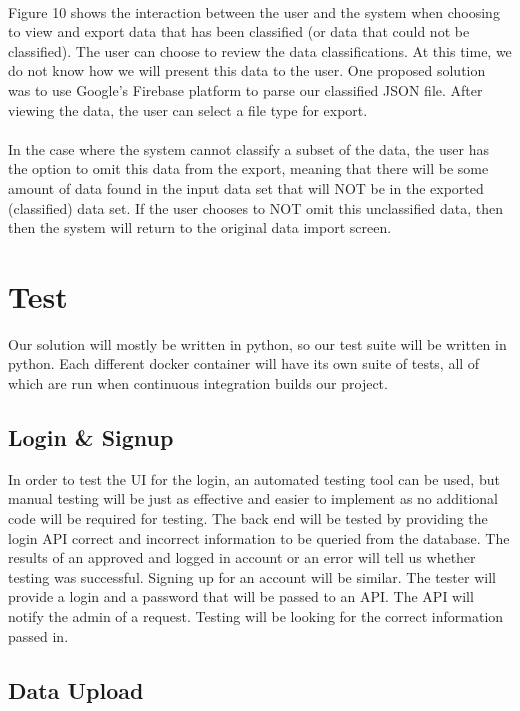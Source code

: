 \documentclass[12pt,oneside,letterpaper]{article}
\begin{document}
\paragraph{}Figure 10 shows the interaction between the user and the system when choosing to view and export data that has been classified (or data that could not be classified). The user can choose to review the data classifications. At this time, we do not know how we will present this data to the user. One proposed solution was to use Google's Firebase platform to parse our classified JSON file. After viewing the data, the user can select a file type for export.

\paragraph{}In the case where the system cannot classify a subset of the data, the user has the option to omit this data from the export, meaning that there will be some amount of data found in the input data set that will NOT be in the exported (classified) data set. If the user chooses to NOT omit this unclassified data, then then the system will return to the original data import screen.

\section{Test}
Our solution will mostly be written in python, so our test suite will be written in python. Each different docker container will have its own suite of tests, all of which are run when continuous integration builds our project.

\subsection{Login \& Signup}
In order to test the UI for the login, an automated testing tool can be used, but manual testing will be just as effective and easier to implement as no additional code will be required for testing. The back end will be tested by providing the login API correct and incorrect information to be queried from the database. The results of an approved and logged in account or an error will tell us whether testing was successful.
Signing up for an account will be similar. The tester will provide a login and a password that will be passed to an API. The API will notify the admin of a request. Testing will be looking for the correct information passed in.

\subsection{Data Upload}
\end{document}
